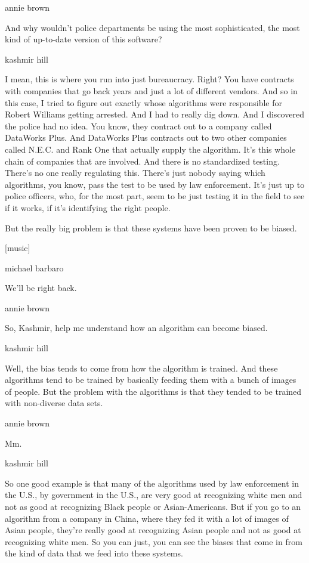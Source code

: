 annie brown

And why wouldn't police departments be using the most sophisticated, the
most kind of up-to-date version of this software?

kashmir hill

I mean, this is where you run into just bureaucracy. Right? You have
contracts with companies that go back years and just a lot of different
vendors. And so in this case, I tried to figure out exactly whose
algorithms were responsible for Robert Williams getting arrested. And I
had to really dig down. And I discovered the police had no idea. You
know, they contract out to a company called DataWorks Plus. And
DataWorks Plus contracts out to two other companies called N.E.C. and
Rank One that actually supply the algorithm. It's this whole chain of
companies that are involved. And there is no standardized testing.
There's no one really regulating this. There's just nobody saying which
algorithms, you know, pass the test to be used by law enforcement. It's
just up to police officers, who, for the most part, seem to be just
testing it in the field to see if it works, if it's identifying the
right people.

But the really big problem is that these systems have been proven to be
biased.

{[}music{]}

michael barbaro

We'll be right back.

annie brown

So, Kashmir, help me understand how an algorithm can become biased.

kashmir hill

Well, the bias tends to come from how the algorithm is trained. And
these algorithms tend to be trained by basically feeding them with a
bunch of images of people. But the problem with the algorithms is that
they tended to be trained with non-diverse data sets.

annie brown

Mm.

kashmir hill

So one good example is that many of the algorithms used by law
enforcement in the U.S., by government in the U.S., are very good at
recognizing white men and not as good at recognizing Black people or
Asian-Americans. But if you go to an algorithm from a company in China,
where they fed it with a lot of images of Asian people, they're really
good at recognizing Asian people and not as good at recognizing white
men. So you can just, you can see the biases that come in from the kind
of data that we feed into these systems.

